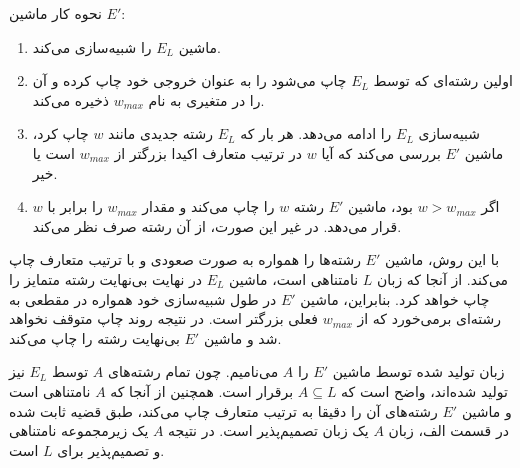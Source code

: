 نحوه کار ماشین $E'$:
\begin{enumerate}
    \item ماشین $E_L$ را شبیه‌سازی می‌کند.
    \item اولین رشته‌ای که توسط $E_L$ چاپ می‌شود را به عنوان خروجی خود چاپ کرده و آن را در متغیری به نام $w_{max}$ ذخیره می‌کند.
    \item شبیه‌سازی $E_L$ را ادامه می‌دهد. هر بار که $E_L$ رشته جدیدی مانند $w$ چاپ کرد، ماشین $E'$ بررسی می‌کند که آیا $w$ در ترتیب متعارف اکیدا بزرگتر از $w_{max}$ است یا خیر.
    \item اگر $w > w_{max}$ بود، ماشین $E'$ رشته $w$ را چاپ می‌کند و مقدار $w_{max}$ را برابر با $w$ قرار می‌دهد. در غیر این صورت، از آن رشته صرف نظر می‌کند.
\end{enumerate}

با این روش، ماشین $E'$ رشته‌ها را همواره به صورت صعودی و با ترتیب متعارف چاپ می‌کند.
از آنجا که زبان $L$ نامتناهی است، ماشین $E_L$ در نهایت بی‌نهایت رشته متمایز را چاپ خواهد کرد. بنابراین، ماشین $E'$ در طول شبیه‌سازی خود همواره در مقطعی به رشته‌ای برمی‌خورد که از $w_{max}$ فعلی بزرگتر است. در نتیجه روند چاپ متوقف نخواهد شد و ماشین $E'$ بی‌نهایت رشته را چاپ می‌کند.

زبان تولید شده توسط ماشین $E'$ را $A$ می‌نامیم. چون تمام رشته‌های $A$ توسط $E_L$ نیز تولید شده‌اند، واضح است که $A \subseteq L$ برقرار است. همچنین از آنجا که $A$ نامتناهی است و ماشین $E'$ رشته‌های آن را دقیقا به ترتیب متعارف چاپ می‌کند، طبق قضیه ثابت شده در قسمت الف، زبان $A$ یک زبان تصمیم‌پذیر است.
در نتیجه $A$ یک زیرمجموعه نامتناهی و تصمیم‌پذیر برای $L$ است.
